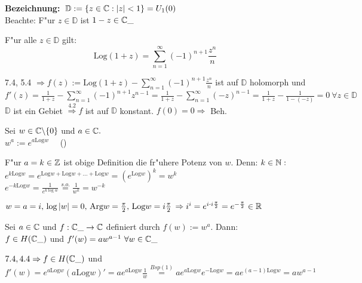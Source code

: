 \documentclass[a4paper,twoside,DIV15,BCOR12mm]{scrbook}
\def\Arg{\text{Arg}}
\def\MdD{\mathbb{D}}
\def\Log{\text{Log}}
\begin{document}
\textbf{Bezeichnung:} $\; \MdD := \{ z \in \MdC : |z| < 1 \} = U_1(0)$ \\
Beachte: F"ur $z \in \MdD$ ist $1-z \in \mathbb{C}\_$

\begin{satz}
F"ur alle $ z \in \MdD$ gilt:
\[
\Log (1+z) = \sum_{n=1}^{\infty} (-1)^{n+1} \frac{z^n}{n} 
\]
\end{satz}

\begin{beweis}
7.4, 5.4 $\Rightarrow f(z) := \Log(1+z) - \sum_{n=1}^{\infty} (-1)^{n+1} \frac{z^n}{n}$ ist auf $\MdD$ holomorph und \\
$f'(z) = \frac1{1+z} - \sum_{n=1}^{\infty} (-1)^{n+1} z^{n-1} = \frac1{1+z} - \sum_{n=1}^{\infty} (-z)^{n-1} = \frac1{1+z} - \frac1{1-(-z)} = 0 \ \forall z \in \MdD$\\
$\MdD$ ist ein Gebiet $\stackrel{4.2}{\Rightarrow} f$ ist auf $\MdD$ konstant. $f(0) = 0 \Rightarrow$ Beh.
\end{beweis}

\begin{definition}
Sei $w \in \mathbb{C} \backslash \{0\}$ und $a \in \mathbb{C}. $\\
$w^a := e^{a \Log w} \quad $ ()
\end{definition}

\begin{beispiele}
\item F"ur $a= k \in \mathbb{Z}$ ist obige Definition die fr"uhere Potenz von $w$. Denn: $k \in \mathbb{N}:$ \\
$e^{k \Log w} = e^{\Log w + \Log w + \dots + \Log w} = \left(e^{\Log w}\right)^k = w^k$\\
$e^{-k \Log w} = \frac1{e^{k \log w}} \stackrel{s.o.}{=} \frac1{w^k} = w^{-k}$
\item $w=a=i, \, \log|w| = 0, \, \Arg w = \frac{\pi}2, \, \Log w = i \frac{\pi}{2} \, \Rightarrow i^i = e^{i\cdot i \frac{\pi}{2}} = e^{-\frac{\pi}{2}} \in \MdR$
\end{beispiele}

\begin{satz}
Sei $a \in \mathbb{C}$ und $f: \mathbb{C}\_ \rightarrow \mathbb{C}$ definiert durch $f(w) := w^a$. Dann: \\
$f \in H(\mathbb{C}\_)$ und $f'(w) = aw^{a-1} \ \forall w \in \mathbb{C}\_$
\end{satz}

\begin{beweis}
$7.4, 4.4 \Rightarrow f \in H(\mathbb{C}\_)$ und $f'(w) = e^{a \Log w}(a \Log w)' = ae^{a \Log w}\frac1w \stackrel{Bsp(1)}{=} ae^{a \Log w}e^{- \Log w} = ae^{(a-1) \Log w} = aw^{a-1}$
\end{beweis}
\end{document}
